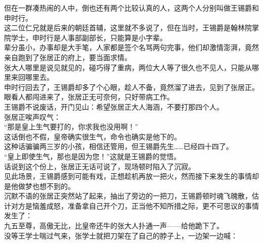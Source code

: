 \begin{multicols}{\theparacolNo}
但在一群凑热闹的人中，倒也还有两个比较认真的人，这两个人分别叫做王锡爵和申时行。\\

这二位仁兄就是后来的朝廷首辅，这里就不多说了，但在当时，王锡爵是翰林院掌院学士，申时行是人事部副部长，只能算是小字辈。\\

辈分虽小，办事却是大手笔，人家都是签个名骂两句完事，他们却激情澎湃，竟然亲自跑到了张居正的府上，要当面求情。\\

张大人哪里是说见就见的，碰巧得了重病，两位大人等了很久也不见人，只能从哪里来回哪里去。\\

申时行回去了，王锡爵却多了个心眼，趁人不备，竟然溜了进去，见到了张居正。\\

眼看人都闯进来了，张居正无可奈何，只好带病工作。\\

王锡爵不说废话，开门见山：希望张居正大人海涵，不要打那四个人。\\

张居正唉声叹气：\\

“那是皇上生气要打的，你求我也没用啊！”\\

这话倒也不假，皇帝确实很生气，命令也确实是他下的。\\

这种话骗骗两三岁的小孩，相信还管用，但王锡爵先生……已经四十四了。\\

“皇上即使生气，那也是因为您！”这就是王锡爵的觉悟。\\

话说到这个份上，张居正无话可说了，现场顿时陷入了沉寂。\\

见此场景，王锡爵感到可能有戏，正想趁机再放一把火，然而接下来发生的事情却是他做梦也想不到的。\\

沉默不语的张居正突然站了起来，抽出了旁边的一把刀，王锡爵顿时魂飞魄散，估计对方是恼羞成怒，准备拿自己开个刀，正当他不知所措之际，更不可思议的事情发生了：\\

九五至尊，高傲无比，比皇帝还牛的张大人扑通一声——给他跪下了。\\

没等王学士喘过气来，张学士就把刀架在了自己的脖子上，一边架一边喊：\\


\end{multicols}
